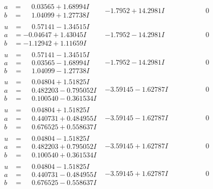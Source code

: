 \documentclass[1p]{elsarticle_modified}
\theoremstyle{definition}
\begin{document}
$$\begin{array}{c|c|c}
\begin{aligned}
a &= \phantom{-}0.03565 + 1.68994 I \\
b &= \phantom{-}1.04099 + 1.27738 I\end{aligned}
 & -1.7952 + 14.2981 I & \phantom{-0.000000 } 0 \\ \hline\begin{aligned}
u &= \phantom{-}0.57141 - 1.34515 I \\
a &= -0.04647 + 1.43045 I \\
b &= -1.12942 + 1.11659 I\end{aligned}
 & -1.7952 - 14.2981 I & \phantom{-0.000000 } 0 \\ \hline\begin{aligned}
u &= \phantom{-}0.57141 - 1.34515 I \\
a &= \phantom{-}0.03565 - 1.68994 I \\
b &= \phantom{-}1.04099 - 1.27738 I\end{aligned}
 & -1.7952 - 14.2981 I & \phantom{-0.000000 } 0 \\ \hline\begin{aligned}
u &= \phantom{-}0.04804 + 1.51825 I \\
a &= \phantom{-}0.482203 - 0.795052 I \\
b &= \phantom{-}0.100540 - 0.361534 I\end{aligned}
 & -3.59145 - 1.62787 I & \phantom{-0.000000 } 0 \\ \hline\begin{aligned}
u &= \phantom{-}0.04804 + 1.51825 I \\
a &= \phantom{-}0.440731 + 0.484955 I \\
b &= \phantom{-}0.676525 + 0.558637 I\end{aligned}
 & -3.59145 - 1.62787 I & \phantom{-0.000000 } 0 \\ \hline\begin{aligned}
u &= \phantom{-}0.04804 - 1.51825 I \\
a &= \phantom{-}0.482203 + 0.795052 I \\
b &= \phantom{-}0.100540 + 0.361534 I\end{aligned}
 & -3.59145 + 1.62787 I & \phantom{-0.000000 } 0 \\ \hline\begin{aligned}
u &= \phantom{-}0.04804 - 1.51825 I \\
a &= \phantom{-}0.440731 - 0.484955 I \\
b &= \phantom{-}0.676525 - 0.558637 I\end{aligned}
 & -3.59145 + 1.62787 I & \phantom{-0.000000 } 0\\

\end{array}$$
\end{document}
